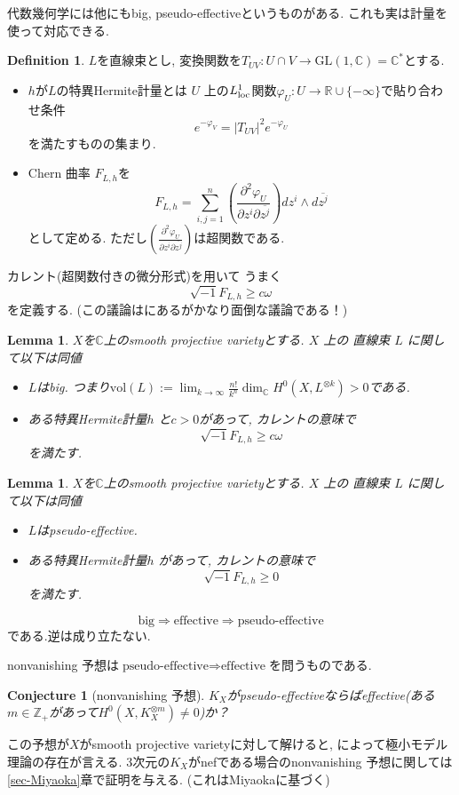 \documentclass[dvipdfmx,a4paper,11pt]{article} %
\newtheorem{conj}[thm]{Conjecture}
\newtheorem{lem}[thm]{Lemma}
\theoremstyle{definition}
\newtheorem{defn}[thm]{Definition}
\theoremstyle{remark}
\numberwithin{equation}{section}
\newcommand{\loc}{{\rm loc}}
\newcommand{\R}{\mathbb{R}}
\newcommand{\N}{\mathbb{Z}_+}
\newcommand{\C}{\mathbb{C}}
\begin{document}
代数幾何学には他にもbig, pseudo-effectiveというものがある. これも実は計量を使って対応できる. 
\begin{defn}
$L$を直線束とし, 変換関数を\({T_{UV}} : U \cap V \to \mathrm{GL}(1,\C)=\C^{*}\)とする. 
\begin{itemize}
\item $h$が$L$の特異Hermite計量とは \(U\) 上の$L^1_{\loc}$関数\(\varphi_U: U \to \R \cup \{- \infty \}\)で貼り合わせ条件
\[
e^{- \varphi_V}
 =|T_{UV}|^2 e^{- \varphi_U}
\]
を満たすものの集まり.
\item Chern 曲率 $F_{L,h}$を
$$
F_{L,h}
= \sum_{i, j=1}^{n}
\left(
\frac{\partial^2 \varphi_U }{\partial z^i \partial \overline{z^j}} 
\right)
dz^i \wedge d \overline{z^j}
$$
として定める. ただし$\left(
\frac{\partial^2 \varphi_U }{\partial z^i \partial \overline{z^j}} 
\right)$は超関数である. 
\end{itemize}
 \end{defn}
カレント(超関数付きの微分形式)を用いて
うまく
$$
 \sqrt{-1}F_{L,h} \ge c\omega
$$
を定義する. (この議論は\cite{Dem12}にあるがかなり面倒な議論である！)

\begin{lem}
$X$を$\C$上のsmooth projective varietyとする.  \(X\) 上の 直線束 \(L\) に関して以下は同値
\begin{itemize}
\item $L$はbig. つまり$\mathrm{vol}(L):=\lim_{k \to\infty}\frac{n!}{k^n} \dim_\C H^0(X, L^{\otimes k})>0$である. 
\item ある特異Hermite計量\(h\) と$c>0$があって, カレントの意味で
\[
 \sqrt{-1}F_{L,h}\geq c \omega
\]
を満たす. 
\end{itemize}
\end{lem}
\begin{lem}
$X$を$\C$上のsmooth projective varietyとする.  \(X\) 上の 直線束 \(L\) に関して以下は同値
\begin{itemize}
\item $L$はpseudo-effective. 
\item ある特異Hermite計量\(h\) があって, カレントの意味で
\[
 \sqrt{-1}F_{L,h}\geq 0
\]
を満たす. 
\end{itemize}
\end{lem}
$$
\text{big} \Rightarrow
\text{effective} \Rightarrow \text{pseudo-effective} 
$$
である.逆は成り立たない. 

nonvanishing 予想は$\text{pseudo-effective} \Rightarrow \text{effective} $を問うものである.
\begin{conj}[nonvanishing 予想]
$K_X$がpseudo-effectiveならばeffective(ある$m \in \N$があって$H^0(X, K_{X}^{\otimes m}) \neq 0$)か？
\end{conj}
この予想が$X$がsmooth projective varietyに対して解けると, \cite{Has18}によって極小モデル理論の存在が言える.
3次元の$K_X$がnefである場合のnonvanishing 予想に関しては\ref{sec-Miyaoka}章で証明を与える. (これはMiyaoka\cite{Miy87}に基づく)
\end{document}

